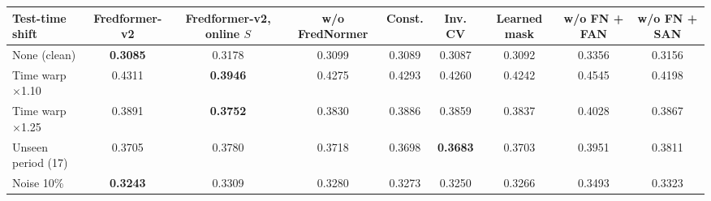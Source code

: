 \begin{tabular}{lcccccccc}
\toprule
Test-time shift & Fredformer-v2 & Fredformer-v2, online $S$ & w/o FredNormer & Const. & Inv. CV & Learned mask & w/o FN + FAN & w/o FN + SAN \\
\midrule
None (clean) & \textbf{0.3085} & 0.3178 & 0.3099 & 0.3089 & 0.3087 & 0.3092 & 0.3356 & 0.3156 \\
Time warp $\times$1.10 & 0.4311 & \textbf{0.3946} & 0.4275 & 0.4293 & 0.4260 & 0.4242 & 0.4545 & 0.4198 \\
Time warp $\times$1.25 & 0.3891 & \textbf{0.3752} & 0.3830 & 0.3886 & 0.3859 & 0.3837 & 0.4028 & 0.3867 \\
Unseen period (17) & 0.3705 & 0.3780 & 0.3718 & 0.3698 & \textbf{0.3683} & 0.3703 & 0.3951 & 0.3811 \\
Noise 10\% & \textbf{0.3243} & 0.3309 & 0.3280 & 0.3273 & 0.3250 & 0.3266 & 0.3493 & 0.3323 \\
\bottomrule
\end{tabular}
